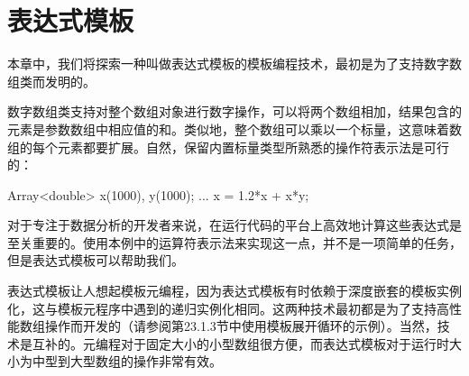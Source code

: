 \chapter{表达式模板}
本章中，我们将探索一种叫做表达式模板的模板编程技术，最初是为了支持数字数组类而发明的。

数字数组类支持对整个数组对象进行数字操作，可以将两个数组相加，结果包含的元素是参数数组中相应值的和。类似地，整个数组可以乘以一个标量，这意味着数组的每个元素都要扩展。自然，保留内置标量类型所熟悉的操作符表示法是可行的：

\begin{cpp}
Array<double> x(1000), y(1000);
...
x = 1.2*x + x*y;
\end{cpp}

对于专注于数据分析的开发者来说，在运行代码的平台上高效地计算这些表达式是至关重要的。使用本例中的运算符表示法来实现这一点，并不是一项简单的任务，但是表达式模板可以帮助我们。

表达式模板让人想起模板元编程，因为表达式模板有时依赖于深度嵌套的模板实例化，这与模板元程序中遇到的递归实例化相同。这两种技术最初都是为了支持高性能数组操作而开发的（请参阅第23.1.3节中使用模板展开循环的示例）。当然，技术是互补的。元编程对于固定大小的小型数组很方便，而表达式模板对于运行时大小为中型到大型数组的操作非常有效。














































